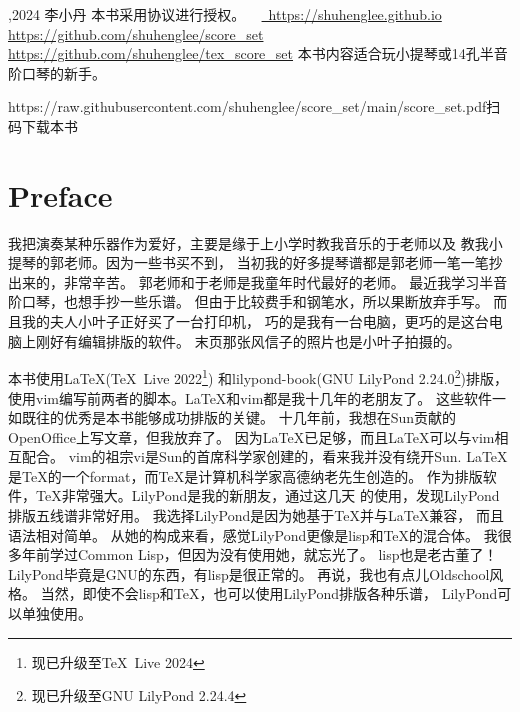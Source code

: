 \documentclass[a4paper,twoside]{memoir}
\begin{document}
\marktrue
\multimarktrue

\maketitle
\subtitlepage

\thispagestyle{empty}
{\obeylines\parindent=0pt\smallskip
{},2024 李小丹
本书采用\ccby 协议进行授权。
\ \myemail
\href{https://shuhenglee.github.io}%
{\ https://shuhenglee.github.io}
\href{https://github.com/shuhenglee/score\_set}%
{\kern-4pt\faGithub https://github.com/shuhenglee/score\_set}
\href{https://github.com/shuhenglee/tex\_score\_set}%
{\kern-4pt\faCode https://github.com/shuhenglee/tex\_score\_set}
\bigskip
本书内容适合玩小提琴或14孔半音阶口琴的新手。\bigskip}

\noindent\printbookver
\vfill
\hfill\theqr{\faGithub}%
{https://raw.githubusercontent.com/shuhenglee/score_set/main/score_set.pdf}{扫码下载本书}
\eject

\AddEverypageHook{\epcall}

\frontmatter

\chapter{Preface}
我把演奏某种乐器作为爱好，主要是缘于上小学时教我音乐的于老师以及
教我小提琴的郭老师。因为一些书买不到，
当初我的好多提琴谱都是郭老师一笔一笔抄出来的，非常辛苦。
郭老师和于老师是我童年时代最好的老师。
最近我学习半音阶口琴，也想手抄一些乐谱。
但由于比较费手和钢笔水，所以果断放弃手写。
而且我的夫人小叶子正好买了一台打印机，
巧的是我有一台电脑，更巧的是这台电脑上刚好有编辑排版的软件。
末页那张风信子的照片也是小叶子拍摄的。

本书使用\LaTeX (\TeX\ Live 2022\footnote{现已升级至\TeX\ Live 2024})
和lilypond-book(GNU LilyPond 2.24.0\footnote{现已升级至GNU LilyPond 2.24.4})排版，
使用vim编写前两者的脚本。\LaTeX 和vim都是我十几年的老朋友了。
这些软件一如既往的优秀是本书能够成功排版的关键。
十几年前，我想在Sun贡献的OpenOffice上写文章，但我放弃了。
因为\LaTeX 已足够，而且\LaTeX 可以与vim相互配合。
vim的祖宗vi是Sun的首席科学家创建的，看来我并没有绕开Sun.
\LaTeX 是\TeX 的一个format，而\TeX 是计算机科学家高德纳老先生创造的。
作为排版软件，\TeX 非常强大。LilyPond是我的新朋友，通过这几天
的使用，发现LilyPond排版五线谱非常好用。
我选择LilyPond是因为她基于\TeX 并与\LaTeX 兼容，
而且语法相对简单。
从她的构成来看，感觉LilyPond更像是lisp和\TeX 的混合体。
我很多年前学过Common Lisp，但因为没有使用她，就忘光了。
lisp也是老古董了！LilyPond毕竟是GNU的东西，有lisp是很正常的。
再说，我也有点儿Oldschool风格。
当然，即使不会lisp和\TeX ，也可以使用LilyPond排版各种乐谱，
LilyPond可以单独使用。
\end{document}
